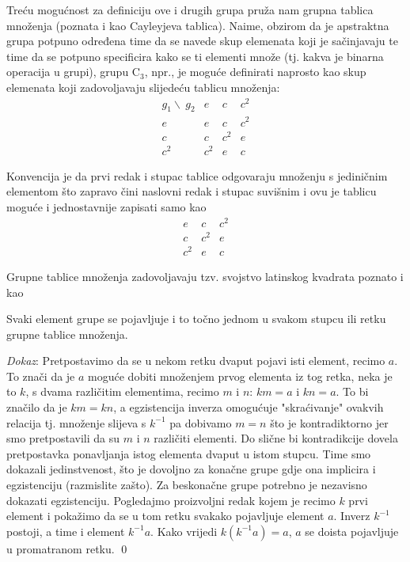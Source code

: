 Treću mogućnost za definiciju ove i drugih grupa pruža nam grupna tablica množenja
(poznata i kao Cayleyjeva tablica).
Naime, obzirom da je apstraktna grupa potpuno određena time da se navede
skup elemenata koji je sačinjavaju te time da se potpuno specificira kako
se ti elementi množe (tj. kakva je binarna operacija u grupi), grupu C$_3$, npr.,
je moguće definirati naprosto kao skup elemenata koji zadovoljavaju slijedeću tablicu
množenja:  
\vspace{1ex}
\begin{equation}
\begin{array}{c|ccc}
g_1\backslash\ g_2 & e & c & c^2 \\ \hline
   e    & e & c & c^2 \\
   c    & c & c^2 & e \\
   c^2    & c^2 & e & c
\end{array}
\label{eq:cntab}
\end{equation}

Konvencija je da prvi redak i stupac tablice odgovaraju množenju
s jediničnim elementom što zapravo čini naslovni redak i stupac
suvišnim i ovu je tablicu moguće i jednostavnije zapisati samo kao
\vspace{1ex}
\begin{equation}
\begin{array}{|ccc}
 \hline
 e & c & c^2 \\
 c & c^2 & e \\
 c^2 & e & c
\end{array}
\label{eq:cntabsimple}
\end{equation}

Grupne tablice množenja zadovoljavaju tzv. svojstvo latinskog
kvadrata poznato i kao  
\begin{teorem}
Svaki element grupe se pojavljuje i to točno jednom u svakom stupcu
ili retku grupne tablice množenja.
\end{teorem}

\emph{Dokaz}: Pretpostavimo da se u nekom retku
dvaput pojavi isti element, recimo $a$. To znači da je $a$ moguće
dobiti množenjem prvog elementa iz tog retka, neka je to $k$, s
dvama različitim elementima, recimo $m$ i $n$: $km=a$ i $kn=a$. To bi značilo
da je $km=kn$, a egzistencija inverza omogućuje "skraćivanje"
ovakvih relacija tj. množenje slijeva s $k^{-1}$ pa
dobivamo $m=n$ što je kontradiktorno jer smo pretpostavili da su
$m$ i $n$ različiti elementi. Do slične bi kontradikcije dovela
pretpostavka  ponavljanja istog elementa dvaput u istom stupcu.
Time smo dokazali jedinstvenost, što je dovoljno za konačne grupe
gdje ona implicira i egzistenciju (razmislite zašto). Za beskonačne grupe
potrebno je nezavisno dokazati egzistenciju. Pogledajmo proizvoljni redak
kojem je recimo $k$ prvi element i pokažimo da se u tom retku svakako pojavljuje
element $a$. Inverz $k^{-1}$ postoji,  a time i element $k^{-1}a$. Kako
vrijedi $k(k^{-1}a) = a$, $a$ se doista pojavljuje u promatranom retku.
\qed

